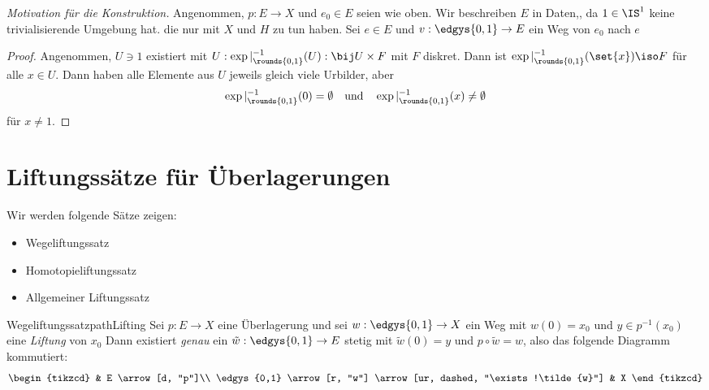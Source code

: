 \documentclass[language=ngerman]{TemplateLecture} %
\begin{document}
\begin{example}
\begin{enumerate}[$(a)$]
        \emph{Motivation für die Konstruktion.} Angenommen, $p: E \to X$ und $e_0 \in E$ seien wie oben. Wir beschreiben $E$ in Daten,, da $1 \in \IS^1$ keine trivialisierende Umgebung hat.  die nur mit $X$ und $H$ zu tun haben. Sei $e \in E$ und $v: \edgys{0,1} \to E$ ein Weg von $e_0$ nach $e$
        \begin{proof}
            Angenommen, $U \ni 1$ existiert mit $U: \exp|_{\rounds{0,1}}^{-1}(U): \bij U \times F$ mit $F$ diskret. Dann ist $\exp|_{\rounds{0,1}}^{-1}(\set{x}) \iso F$ für alle $x \in U$. Dann haben alle Elemente aus $U$ jeweils gleich viele Urbilder, aber
            \begin{equation*}
                \exp|_{\rounds{0,1}}^{-1}(0) = \emptyset \quad \text{und} \quad \exp|_{\rounds{0,1}}^{-1}(x) \neq \emptyset
            \end{equation*}
            für $x \neq 1$.
        \end{proof}
    \end{enumerate}
\end{example}

\section{Liftungssätze für Überlagerungen}
Wir werden folgende Sätze zeigen:
\begin{itemize}
    \item Wegeliftungssatz
    \item Homotopieliftungssatz
    \item Allgemeiner Liftungssatz
\end{itemize}

\begin{thm}{Wegeliftungssatz}{pathLifting}
    Sei $p: E \to X$ eine Überlagerung und sei $w: \edgys{0,1} \to X$ ein Weg mit $w(0) = x_0$ und $y \in p^{-1}(x_0)$ eine \emph{Liftung} von $x_0$ Dann existiert \emph{genau} ein $\tilde{w}: \edgys{0,1} \to E$ stetig mit $\tilde{w}(0) = y$ und $p \circ \tilde{w} = w$, also das folgende Diagramm kommutiert:
    \begin{equation*}
        \begin{tikzcd}
            & E \arrow[d, "p"]\\
            \edgys{0,1} \arrow[r, "w"] \arrow[ur, dashed, "\exists!\tilde{w}"] & X 
        \end{tikzcd}
    \end{equation*}
\end{thm}
\end{document}
